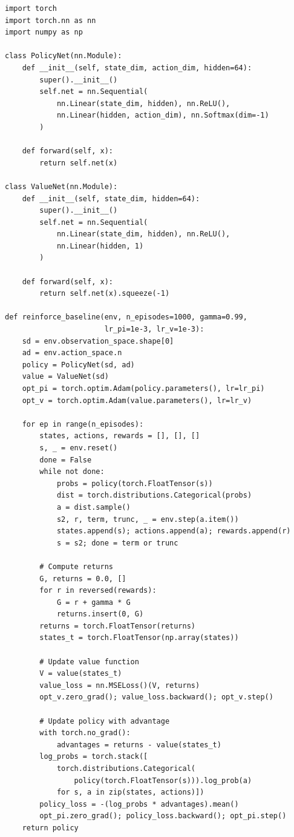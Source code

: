 \begin{codeblock}[title=\textbf{REINFORCE with Baseline}]
\begin{verbatim}
import torch
import torch.nn as nn
import numpy as np

class PolicyNet(nn.Module):
    def __init__(self, state_dim, action_dim, hidden=64):
        super().__init__()
        self.net = nn.Sequential(
            nn.Linear(state_dim, hidden), nn.ReLU(),
            nn.Linear(hidden, action_dim), nn.Softmax(dim=-1)
        )

    def forward(self, x):
        return self.net(x)

class ValueNet(nn.Module):
    def __init__(self, state_dim, hidden=64):
        super().__init__()
        self.net = nn.Sequential(
            nn.Linear(state_dim, hidden), nn.ReLU(),
            nn.Linear(hidden, 1)
        )

    def forward(self, x):
        return self.net(x).squeeze(-1)

def reinforce_baseline(env, n_episodes=1000, gamma=0.99,
                       lr_pi=1e-3, lr_v=1e-3):
    sd = env.observation_space.shape[0]
    ad = env.action_space.n
    policy = PolicyNet(sd, ad)
    value = ValueNet(sd)
    opt_pi = torch.optim.Adam(policy.parameters(), lr=lr_pi)
    opt_v = torch.optim.Adam(value.parameters(), lr=lr_v)

    for ep in range(n_episodes):
        states, actions, rewards = [], [], []
        s, _ = env.reset()
        done = False
        while not done:
            probs = policy(torch.FloatTensor(s))
            dist = torch.distributions.Categorical(probs)
            a = dist.sample()
            s2, r, term, trunc, _ = env.step(a.item())
            states.append(s); actions.append(a); rewards.append(r)
            s = s2; done = term or trunc

        # Compute returns
        G, returns = 0.0, []
        for r in reversed(rewards):
            G = r + gamma * G
            returns.insert(0, G)
        returns = torch.FloatTensor(returns)
        states_t = torch.FloatTensor(np.array(states))

        # Update value function
        V = value(states_t)
        value_loss = nn.MSELoss()(V, returns)
        opt_v.zero_grad(); value_loss.backward(); opt_v.step()

        # Update policy with advantage
        with torch.no_grad():
            advantages = returns - value(states_t)
        log_probs = torch.stack([
            torch.distributions.Categorical(
                policy(torch.FloatTensor(s))).log_prob(a)
            for s, a in zip(states, actions)])
        policy_loss = -(log_probs * advantages).mean()
        opt_pi.zero_grad(); policy_loss.backward(); opt_pi.step()
    return policy
\end{verbatim}
\end{codeblock}

